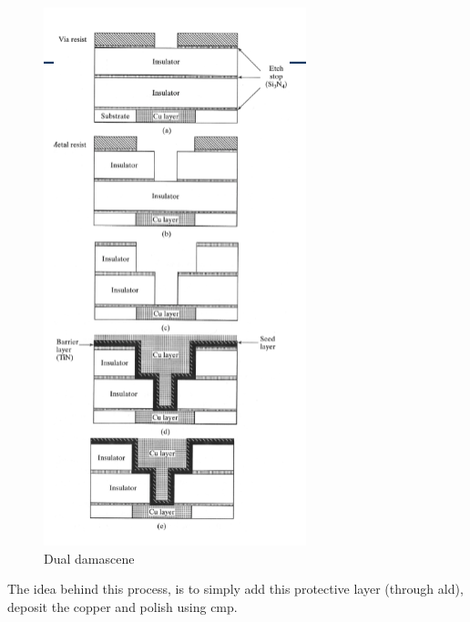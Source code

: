 \documentclass{report}
\begin{document}
\begin{figure}
    \centering
    \includegraphics[width=0.9\linewidth]{dual_damascene.png}
    \caption{Dual damascene}
    \label{fig:enter-label}
\end{figure}

The idea behind this process, is to simply add this protective layer (through \gls{ald}), deposit the copper and polish using \gls{cmp}.
\end{document}
